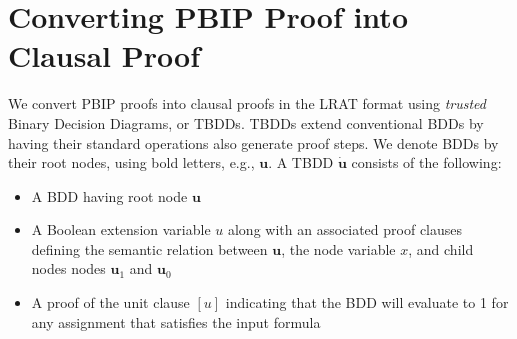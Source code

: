 \documentclass{easychair}
\newcommand{\trust}[1]{\dot {#1}}
\newcommand{\node}[1]{\mathbf{#1}}
\newcommand{\nodeu}{\node{u}}
\begin{document}
\section{Converting PBIP Proof into Clausal Proof}

We convert PBIP proofs into clausal proofs in the LRAT format using
{\em trusted} Binary Decision Diagrams, or TBDDs.  TBDDs extend
conventional BDDs by having their standard operations also generate proof steps.
We denote BDDs by their root nodes, using bold letters, e.g., $\nodeu$.
A TBDD $\trust{\nodeu}$ consists of the following:
\begin{itemize}
\item A BDD having root node $\nodeu$
\item A Boolean extension variable $u$ along with an associated
  proof clauses defining the semantic relation between $\nodeu$,  the node variable $x$, and 
  child nodes
  nodes $\nodeu_1$ and $\nodeu_0$
\item A proof of the unit clause $[u]$ indicating that the BDD will evaluate to 1 for any assignment that satisfies the input formula
\end{itemize}
\end{document}
